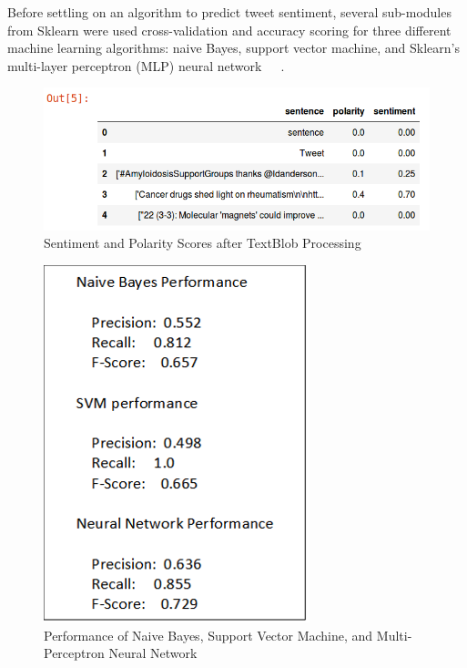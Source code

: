 Before settling on an algorithm to predict tweet sentiment, several
sub-modules from Sklearn were used cross-validation and accuracy
scoring for three different machine learning algorithms: naive Bayes,
support vector machine, and Sklearn's multi-layer perceptron (MLP)
neural
network~\cite{brownlee_2016}~\cite{ads_algorithms}~\cite{raschka2016}.

\begin{figure}[H]
\centering
\includegraphics[width=\columnwidth]{images/collected_tweets_head.png}
\caption{Sentiment and Polarity Scores after TextBlob Processing}
\label{fig:scores_textblob}
\end{figure} 

\begin{figure}[H]
\centering
\includegraphics[width=\columnwidth]{images/ML_algorithms_performance.png}
\caption{Performance of Naive Bayes, Support Vector Machine, and Multi-Perceptron 
Neural Network}
\label{fig:performance_scores}
\end{figure} 

